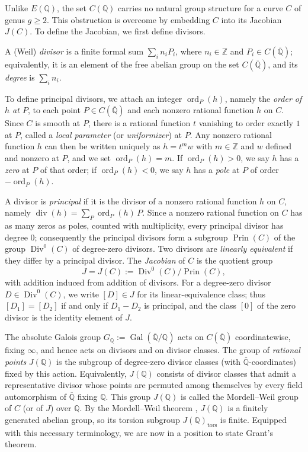 \documentclass[11pt,a4paper]{amsart}
\newcommand{\ZZ}{\mathbb{Z}}
\newcommand{\Q}{\mathbb{Q}}
\newcommand{\Qbar}{\overline{\mathbb{Q}}}
\theoremstyle{plain}
\theoremstyle{definition}
\DeclareMathOperator{\ddiv}{div}      %
\DeclareMathOperator{\ord}{ord}
\begin{document}
Unlike $E(\Q)$, the set $C(\Q)$ carries no natural group structure for a curve $C$ of genus $g \ge 2$. This obstruction is overcome by embedding $C$ into its Jacobian $J(C)$. To define the Jacobian, we first define divisors.



A (Weil) \textit{divisor} is a finite formal sum $\sum_i n_i P_i$, where $n_i \in \ZZ$ and $P_i \in C(\Qbar)$; equivalently, it is an element of the free abelian group on the set $C(\Qbar)$, and its \textit{degree} is $\sum_i n_i$.

To define principal divisors, we attach an integer $\ord_P(h)$, namely the \textit{order of $h$ at $P$}, to each point $P\in C(\Qbar)$ and each nonzero rational function $h$ on $C$. Since $C$ is smooth at $P$, there is a rational function $t$ vanishing to order exactly $1$ at $P$, called a \textit{local parameter} (or \textit{uniformizer}) at $P$. Any nonzero rational function $h$ can then be written uniquely as $h = t^{m} w$ with $m\in\ZZ$ and $w$ defined and nonzero at $P$, and we set $\ord_P(h)=m$. If $\ord_P(h)>0$, we say $h$ has a \textit{zero} at $P$ of that order; if $\ord_P(h)<0$, we say $h$ has a \textit{pole} at $P$ of order $-\ord_P(h)$.

A divisor is \textit{principal} if it is the divisor of a nonzero rational function
$h$ on $C$, namely $\ddiv(h)=\sum_P \ord_P(h)\,P$. Since a nonzero rational function
on $C$ has as many zeros as poles, counted with multiplicity, every principal divisor
has degree $0$; consequently the principal divisors form a subgroup
$\operatorname{Prin}(C)$ of the group $\operatorname{Div}^0(C)$ of degree-zero
divisors. Two divisors are \textit{linearly equivalent} if they differ by a principal
divisor. The \textit{Jacobian} of $C$ is the quotient group
\[
  J = J(C) := \operatorname{Div}^0(C)/\operatorname{Prin}(C),
\]
with addition induced from addition of divisors. For a degree-zero divisor
$D \in \operatorname{Div}^0(C)$, we write $[D] \in J$ for its linear-equivalence class;
thus $[D_1] = [D_2]$ if and only if $D_1 - D_2$ is principal, and the class $[0]$ of
the zero divisor is the identity element of $J$.



The absolute Galois group $G_{\Q}:=\operatorname{Gal}(\Qbar/\Q)$
acts on $C(\Qbar)$ coordinatewise, fixing $\infty$, and hence acts on divisors and on divisor classes. The group of \textit{rational points} $J(\Q)$ is the subgroup of degree-zero divisor classes (with $\Qbar$-coordinates) fixed by this action. Equivalently, $J(\Q)$ consists of divisor classes that admit a representative divisor whose points are permuted among themselves by every field automorphism of $\Qbar$ fixing $\Q$. This group $J(\Q)$ is called the Mordell--Weil group of $C$ (or of $J$) over $\Q$. By the Mordell--Weil theorem \cite{Weil1929}, $J(\Q)$ is a finitely generated abelian group, so its torsion subgroup $J(\Q)_{\mathrm{tors}}$ is finite. Equipped with this necessary terminology, we are now in a position to state Grant's theorem.
\end{document}
